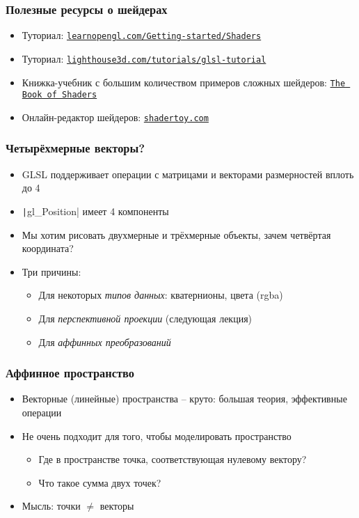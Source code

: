 \documentclass[10pt]{beamer}
\begin{document}
\begin{frame}[fragile]
\frametitle{Полезные ресурсы о шейдерах}
\begin{itemize}
\item Туториал: \href{https://learnopengl.com/Getting-started/Shaders}{\nolinkurl{learnopengl.com/Getting-started/Shaders}}
\item Туториал: \href{https://www.lighthouse3d.com/tutorials/glsl-tutorial}{\nolinkurl{lighthouse3d.com/tutorials/glsl-tutorial}}
\pause
\item Книжка-учебник с большим количеством примеров сложных шейдеров: \href{https://thebookofshaders.com/00/}{\texttt{The Book of Shaders}}
\pause
\item Онлайн-редактор шейдеров: \href{https://shadertoy.com/}{\nolinkurl{shadertoy.com}}
\end{itemize}
\end{frame}

\begin{frame}[fragile]
\frametitle{Четырёхмерные векторы?}
\begin{itemize}
\item GLSL поддерживает операции с матрицами и векторами размерностей вплоть до 4
\item \texttt|gl_Position| имеет 4 компоненты
\pause
\item Мы хотим рисовать двухмерные и трёхмерные объекты, зачем четвёртая координата?
\pause
\item Три причины:
\pause
\begin{itemize}
\item Для некоторых \textit{типов данных}: кватернионы, цвета (rgba)
\pause
\item Для \textit{перспективной проекции} (следующая лекция)
\pause
\item Для \textit{аффинных преобразований}
\end{itemize}
\end{itemize}
\end{frame}

\begin{frame}[fragile]
\frametitle{Аффинное пространство}
\begin{itemize}
\item Векторные (линейные) пространства -- круто: большая теория, эффективные операции
\pause
\item Не очень подходит для того, чтобы моделировать пространство
\pause
\begin{itemize}
\item Где в пространстве точка, соответствующая нулевому вектору?
\pause
\item Что такое сумма двух точек?
\end{itemize}
\pause
\item Мысль: точки \begin{math}\neq\end{math} векторы
\end{itemize}
\end{frame}
\end{document}
